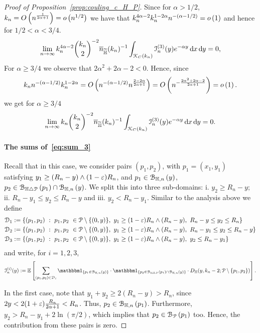 \begin{proof}[Proof of Proposition~\ref{prop:couling_c_H_P}]
Since for $\alpha > 1/2$, $k_n = O\left(n^{\frac{1}{2\alpha +1}}\right) = o\left(n^{1/2}\right)$ we have that $k_n^{4\alpha - 2} k_n^{1 - 2\alpha} n^{-(\alpha - 1/2)} = o\left(1\right)$ and hence for $1/2 < \alpha < 3/4$.
\[
	\lim_{n \to \infty} k_n^{4\alpha - 2} \binom{k_n}{2}^{-2} \overline{n}_{\widetilde{\mathbb{H}}}(k_n)^{-1} \int_{{\mathcal K}_{C}(k_n)} \mathcal{I}_n^{(3)}(y) e^{-\alpha y} \operatorname{\mathrm{d}\hspace{-2pt}} x \operatorname{\mathrm{d}\hspace{-2pt}} y = 0,
\]
For $\alpha \ge 3/4$ we observe that $2\alpha^2 + 2\alpha - 2 < 0$. Hence, since
\[
 	k_n n^{-(\alpha - 1/2)} k_n^{1-2\alpha} = O\left(n^{-(\alpha - 1/2)} n^{\frac{2 - 2\alpha}{2\alpha + 1}}\right)
 	= O\left(n^{- \frac{2\alpha^2 + 2\alpha - 2}{2\alpha + 1}}\right) = o\left(1\right).
\]
we get for $\alpha \ge 3/4$
\[
	\lim_{n \to \infty} k_n \binom{k_n}{2}^{-2} \overline{n}_{\widetilde{\mathbb{H}}}(k_n)^{-1} \int_{{\mathcal K}_{C}(k_n)} \mathcal{I}_n^{(3)}(y) e^{-\alpha y} \operatorname{\mathrm{d}\hspace{-2pt}} x \operatorname{\mathrm{d}\hspace{-2pt}} y = 0.
\]



\paragraph{The sums of~\eqref{eq:sum_3}}
 
Recall that in this case, we consider pairs $(p_1,p_2)$, with $p_1 = (x_1,y_1)$ satisfying 
$y_1 \geq (R_n - y) \wedge (1-\varepsilon)R_n$, and $p_1 \in {\mathcal B}_{\mathbb{H},n}\left(y\right)$, $p_2 \in {\mathcal B}_{\mathbb{H} \bigtriangleup {\mathcal P}}\left(p_1\right) \cap {\mathcal B}_{\mathbb{H},n}\left(y\right)$. 
We split this into three sub-domains:  i. $y_2 \geq R_n - y$; ii. $R_n -y_1 \leq y_2 \leq R_n -y$ and iii. $y_2 < R_n - y_1$. Similar to the analysis above we define
\begin{align*}
	\mathcal{D}_{1} &:= \{(p_1, p_2) \ : \  p_1,p_2 \ \in {\mathcal P} \setminus \{(0,y) \}, \ y_1 \geq (1-\varepsilon) R_n \wedge (R_n-y), 
		\ R_n -y \leq y_2 \leq R_n \}\\
	\mathcal{D}_{2} &:= \{(p_1, p_2) \ : \  p_1,p_2 \ \in {\mathcal P} \setminus \{(0,y) \}, \ y_1 \geq (1-\varepsilon) R_n \wedge (R_n-y), 
		\ R_n -y_1 \leq y_2 \leq R_n - y \}\\
	\mathcal{D}_{3} &:= \{(p_1, p_2) \ : \  p_1,p_2 \ \in {\mathcal P} \setminus \{(0,y) \}, \ y_1 \geq (1-\varepsilon) R_n \wedge (R_n-y), 
		\ y_2 \leq R_n - y_1 \}
\end{align*}
and write, for $i = 1,2,3$,
\[
	\mathcal{I}_n^{(i)}(y) := \Exp { \sum_{(p_1,p_2)  \in \dom{i}} 
	\ind{p_1 \in \BallHyp{y}} \cdot \ind{p_2 \in \BallSym{p_1} \cap \BallHyp{y}}
	\cdot D_\H (y,k_n-2;\Pcal \setminus \{ p_1, p_2\})}.
\]


In the first case, note that $y_1 + y_2 \geq 2(R_n - y) > R_n$, since $2y < 2(1+\varepsilon)
\frac{R_n}{2\alpha +1} < R_n$. Thus, $p_2 \in {\mathcal B}_{\mathbb{H},n}\left(p_1\right)$. Furthermore, 
$y_2 > R_n - y_1 + 2\ln (\pi/2)$, which implies that $p_2 \in {\mathcal B}_{{\mathcal P}}\left(p_1\right)$ too. 
Hence, the contribution from these pairs is zero.   


\end{proof}
